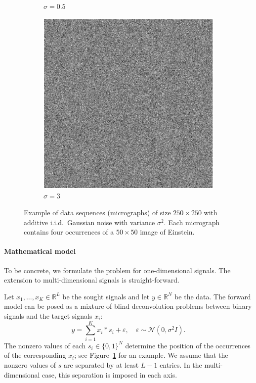 \documentclass[english,11pt]{article}
\theoremstyle{plain}
\theoremstyle{definition}
\theoremstyle{remark}
\theoremstyle{plain}
\newcommand{\RL}{\mathbb{R}^L}
\newcommand{\RN}{\mathbb{R}^N}
\begin{document}
\begin{figure}[h!]
\begin{subfigure}[h]{0.33\textwidth}
		\caption{$\sigma = 0.5$}
	\end{subfigure}
	\begin{subfigure}[h]{0.33\textwidth}
		\centering
		\includegraphics[scale=0.5]{micrograph_Einstein_example_s3}
		\caption{$\sigma = 3$}
	\end{subfigure}
	\caption{\label{fig:micro_example} Example of data sequences (micrographs) of size $250\times 250$ with additive i.i.d.\ Gaussian noise with variance $\sigma^2$. Each micrograph contains four occurrences of a $50 \times 50$ image of Einstein.}	
\end{figure}


\paragraph{Mathematical model}

To be concrete, we formulate the problem for one-dimensional signals. The extension to multi-dimensional signals is straight-forward. 

Let $x_1,\ldots,x_K\in\RL$ be the sought signals and let $y\in\RN$ be the data. 
The forward model can be posed as a mixture of {blind deconvolution} problems between binary signals and the target signals $x_i$:
\begin{equation} \label{eq:model}
y = \sum_{i=1}^K x_i\ast s_i + \varepsilon,\quad \varepsilon\sim\mathcal{N}(0,\sigma^2 I).
\end{equation}
The nonzero values of each  $s_i\in\{0,1\}^N$ determine the position of the occurrences of the corresponding $x_i$; see Figure~\ref{fig:micro_example} for an example. We assume that the nonzero values of $s$ are separated by at least $L-1$ entries. In the multi-dimensional case, this separation is imposed in each axis.  
\end{document}
